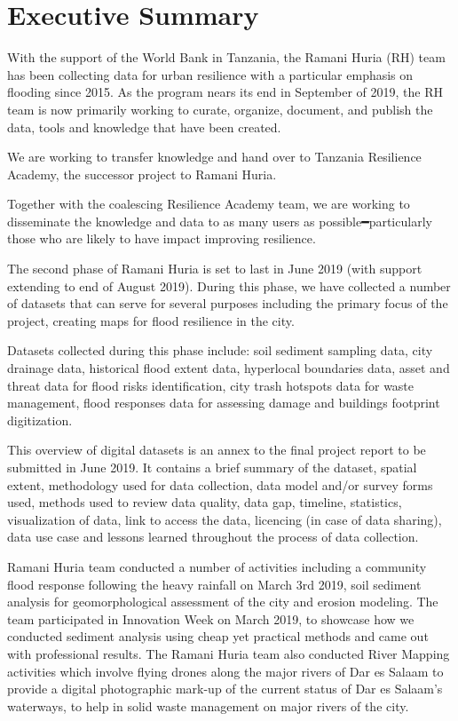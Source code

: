\documentclass[a4paper,12pt,twoside]{article}
\begin{document}
\newpage

\tableofcontents
\newpage
\section{Executive Summary}
\label{executivesummary}
\begin{multicols}{2}

With the support of the World Bank in Tanzania, the Ramani Huria (RH) team has
been collecting data for urban resilience with a particular emphasis on flooding since
2015. As the program nears its end in September of 2019, the RH team is now primarily working to curate, organize, document, and publish the data, tools and knowledge that have been created.

We are working to transfer knowledge and hand over to Tanzania Resilience Academy, the successor project to Ramani Huria.

Together with the coalescing Resilience Academy team, we are working to disseminate the knowledge and data to as many users as possible━particularly those who are likely to have impact improving resilience.

The second phase of Ramani Huria is set to last in June 2019 (with support extending to end of August 2019). During this phase, we have collected a number of datasets that can serve for several purposes including the primary focus of the project, creating maps for flood resilience in the city. 

Datasets collected during this phase include: soil sediment sampling data, city drainage data, historical flood extent data, hyperlocal boundaries data, asset and threat data for flood risks identification, city trash hotspots data for waste management, flood responses data for assessing damage and buildings footprint digitization.

This overview of digital datasets is an annex to the final project report to be submitted in June 2019. It contains a brief summary of the dataset, spatial extent, methodology used for data collection, data model and/or survey forms used, methods used to review data quality, data gap, timeline, statistics, visualization of data, link to access the data, licencing (in case of data sharing), data use case and lessons learned throughout the process of data collection.

Ramani Huria team conducted a number of activities including a community flood response following the heavy rainfall on March 3rd 2019, soil sediment analysis for geomorphological assessment of the city and erosion modeling. The team participated in Innovation Week on March 2019, to showcase how we conducted sediment analysis using cheap yet practical methods and came out with professional results. The Ramani Huria team also conducted River Mapping activities which involve flying drones along the major rivers of Dar es Salaam to  provide a digital photographic mark-up of the current status of Dar es Salaam’s waterways, to help in solid waste management on major rivers of the city.

\end{multicols}
\end{document}
